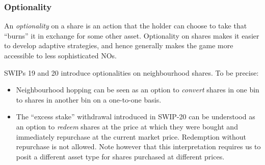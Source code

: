 \subsubsection*{Optionality}

An \emph{optionality} on a share is an action that the holder can choose to take that ``burns'' it in exchange for some other asset.
%
Optionality on shares makes it easier to develop adaptive strategies, and hence generally makes the game more accessible to less sophisticated NOs.

  SWIPs 19 and 20 introduce optionalities on neighbourhood shares. To be precise:
  \begin{itemize}
    \item Neighbourhood hopping can be seen as an option to \emph{convert} shares in one bin to shares in another bin on a one-to-one basis.
    \item The ``excess stake'' withdrawal introduced in SWIP-20 can be understood as an option to \emph{redeem} shares at the price at which they were bought and immediately repurchase at the current market price.
    Redemption without repurchase is not allowed.
    Note however that this interpretation requires us to posit a different asset type for shares purchased at different prices.
  \end{itemize}
\begin{comment}
\subsubsection*{Assumptions of the current model}

This month we were able to lift some of the assumptions of the model we studied in August, but quite a few remain:
\begin{itemize}
  \item Perfect information: all players know the strategies of the other players at all future steps. Perhaps a more realistic approach is to model the mechanism as a (dynamic) Bayes game of incomplete information.
  \item Stationarity: the (expected) revenue of the target neighbourhood remains constant. In reality, expected revenue is affected by network demand, the decisions of stakers via the price oracle, and the price of competing services.
  Similarly, operational costs depend on the costs of hardware and electricity.
  \item We considered all costs and rewards as BZZ denominated. But operational costs and the time preference discount rate $r$ are more easily modelled in terms of fiat currency.
  \item We didn't model any time delays between stake top-ups and reward weight updates.
  \item We didn't model the risk of being frozen or slashed due to liveness failures.
  \item We didn't incorporate changes to the gate function introduced in SWIP-20.
  \item We assumed the neighbourhood count remains constant.
\end{itemize}
\end{comment}